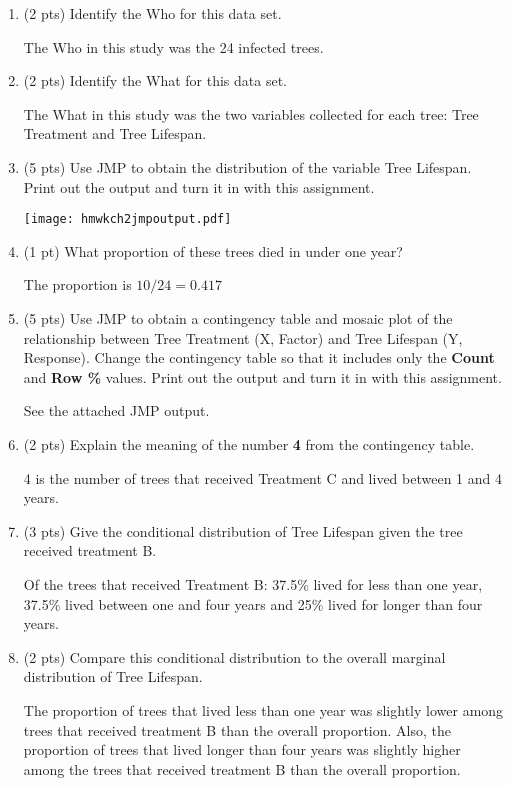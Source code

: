 \documentclass{article}
\begin{document}
\begin{enumerate}
\item (2 pts) Identify the Who for this data set.

The Who in this study was the 24 infected trees.

\item (2 pts) Identify the What for this data set.

The What in this study was the two variables collected for each tree: Tree Treatment and Tree Lifespan.

\item (5 pts) Use JMP to obtain the distribution of the variable Tree Lifespan.  Print out the output and turn it in with this assignment.

\centerline{\texttt{[image: hmwkch2jmpoutput.pdf]}}

\item (1 pt) What proportion of these trees died in under one year?

The proportion is $10/24 = 0.417$

\item (5 pts) Use JMP to obtain a contingency table and mosaic plot of the relationship between Tree Treatment (X, Factor) and Tree Lifespan (Y, Response).  
Change the contingency table so that it includes only the {\bf Count} and {\bf Row \%} values.  Print out the output and turn it in with this assignment. 

See the attached JMP output.

\item (2 pts) Explain the meaning of the number {\bf 4} from the contingency table.

4 is the number of trees that received Treatment C and lived between 1 and 4 years. 


\item (3 pts) Give the conditional distribution of Tree Lifespan given the tree received treatment B.

Of the trees that received Treatment B: 37.5\% lived for less than one year, 37.5\% lived between one and four years and 25\% lived for longer than four years.

\item (2 pts) Compare this conditional distribution to the overall marginal distribution of Tree Lifespan.

The proportion of trees that lived less than one year was slightly lower among trees that received treatment B than the overall proportion.  Also, the proportion of trees that lived longer than four years was slightly higher among the trees that received treatment B than the overall proportion.


\end{enumerate}
\end{document}
